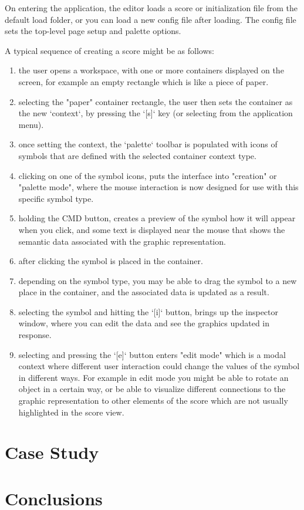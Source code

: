 \documentclass{article}
\begin{document}
On entering the application, the editor loads a score or initialization file from the default load folder, or you can load a new config file after loading. The config file sets the top-level page setup and palette options.

A typical sequence of creating a score might be as follows:
\begin{enumerate}\itemsep0pt
\item the user opens a workspace, with one or more containers displayed on the screen, for example an empty rectangle which is like a piece of paper.
\item selecting the "paper" container rectangle, the user then sets the container as the new `context`, by pressing the `[s]` key (or selecting from the application menu).
\item once setting the context, the `palette` toolbar is populated with icons of symbols that are defined with the selected container context type.
\item clicking on one of the symbol icons, puts the interface into "creation" or "palette mode", where the mouse interaction is now designed for use with this specific symbol type.
\item holding the CMD button, creates a preview of the symbol how it will appear when you click, and some text is displayed near the mouse that shows the semantic data associated with the graphic representation.
\item after clicking the symbol is placed in the container.
\item depending on the symbol type, you may be able to drag the symbol to a new place in the container, and the associated data is updated as a result.
\item selecting the symbol and hitting the `[i]` button, brings up the inspector window, where you can edit the data and see the graphics updated in response.
\item selecting and pressing the `[e]` button enters "edit mode" which is a modal context where different user interaction could change the values of the symbol in different ways. For example in edit mode you might be able to rotate an object in a certain way, or be able to visualize different connections to the graphic representation to other elements of the score which are not usually highlighted in the score view.
\end{enumerate}





\section{Case Study}\label{sec:node_score}



\section{Conclusions}


\begin{acknowledgments}

\end{acknowledgments} 

\balance %

\end{document}
